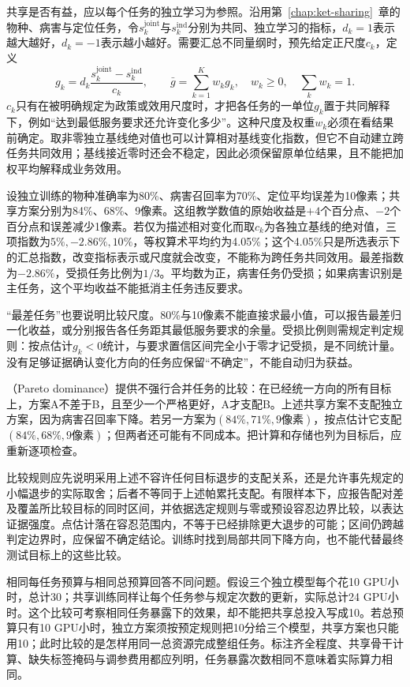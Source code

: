 共享是否有益，应以每个任务的独立学习为参照。沿用第~\ref{chap:ket-sharing}~章的物种、病害与定位任务，令$s_k^{\mathrm{joint}}$与$s_k^{\mathrm{ind}}$分别为共同、独立学习的指标，$d_k=1$表示越大越好，$d_k=-1$表示越小越好。需要汇总不同量纲时，预先给定正尺度$c_k$，定义
\begin{equation}
  g_k=d_k\frac{s_k^{\mathrm{joint}}-s_k^{\mathrm{ind}}}{c_k},
  \qquad \bar g=\sum_{k=1}^{K}w_kg_k,\quad
  w_k\geq0,\quad\sum_kw_k=1.
  \label{eq:ket-evaluation-multitask-gain}
\end{equation}
$c_k$只有在被明确规定为政策或效用尺度时，才把各任务的一单位$g_k$置于共同解释下，例如“达到最低服务要求还允许变化多少”。这种尺度及权重$w_k$必须在看结果前确定。取非零独立基线绝对值也可以计算相对基线变化指数，但它不自动建立跨任务共同效用；基线接近零时还会不稳定，因此必须保留原单位结果，且不能把加权平均解释成业务效用。

设独立训练的物种准确率为80\%、病害召回率为70\%、定位平均误差为10像素；共享方案分别为84\%、68\%、9像素。这组教学数值的原始收益是$+4$个百分点、$-2$个百分点和误差减少1像素。若仅为描述相对变化而取$c_k$为各独立基线的绝对值，三项指数为$5\%,-2.86\%,10\%$，等权算术平均约为4.05\%；这个4.05\%只是所选表示下的汇总指数，改变指标表示或尺度就会改变，不能称为跨任务共同效用。最差指数为$-2.86\%$，受损任务比例为$1/3$。平均数为正，病害任务仍受损；如果病害识别是主任务，这个平均收益不能抵消主任务违反要求。

“最差任务”也要说明比较尺度。80\%与10像素不能直接求最小值，可以报告最差归一化收益，或分别报告各任务距其最低服务要求的余量。受损比例则需规定判定规则：按点估计$g_k<0$统计，与要求置信区间完全小于零才记受损，是不同统计量。没有足够证据确认变化方向的任务应保留“不确定”，不能自动归为获益。

（Pareto dominance）提供不强行合并任务的比较：在已经统一方向的所有目标上，方案A不差于B，且至少一个严格更好，A才支配B。上述共享方案不支配独立方案，因为病害召回率下降。若另一方案为$(84\%,71\%,9\text{像素})$，按点估计它支配$(84\%,68\%,9\text{像素})$；但两者还可能有不同成本。把计算和存储也列为目标后，应重新逐项检查。

比较规则应先说明采用上述不容许任何目标退步的支配关系，还是允许事先规定的小幅退步的实际取舍；后者不等同于上述帕累托支配。有限样本下，应报告配对差及覆盖所比较目标的同时区间，并依据选定规则与零或预设容忍边界比较，以表达证据强度。点估计落在容忍范围内，不等于已经排除更大退步的可能；区间仍跨越判定边界时，应保留不确定结论。训练时找到局部共同下降方向，也不能代替最终测试目标上的这些比较。

相同每任务预算与相同总预算回答不同问题。假设三个独立模型每个花10 GPU小时，总计30；共享训练同样让每个任务参与规定次数的更新，实际总计24 GPU小时。这个比较可考察相同任务暴露下的效果，却不能把共享总投入写成10。若总预算只有10 GPU小时，独立方案须按预定规则把10分给三个模型，共享方案也只能用10；此时比较的是怎样用同一总资源完成整组任务。标注齐全程度、共享骨干计算、缺失标签掩码与调参费用都应列明，任务暴露次数相同不意味着实际算力相同。


